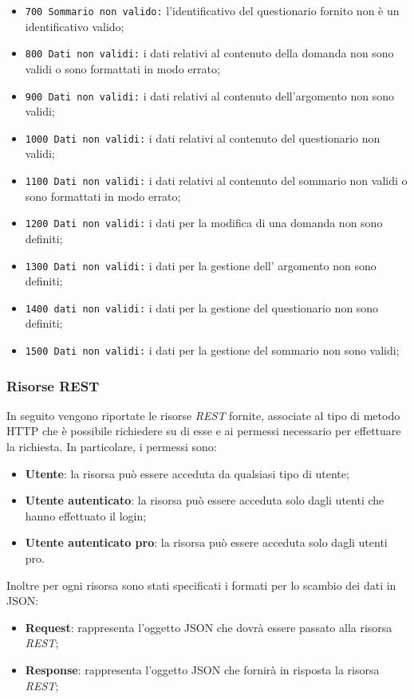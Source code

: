 \begin{itemize}
	\item \texttt{700 Sommario non valido:} l'identificativo del questionario fornito non è un identificativo valido;
	\item \texttt{800 Dati non validi:} i dati relativi al contenuto della domanda non sono  validi o sono formattati in modo errato;
	\item \texttt{900 Dati non validi:} i dati relativi al contenuto dell'argomento non sono validi;
	\item \texttt{1000 Dati non validi:} i dati relativi al contenuto del questionario non validi;
	\item \texttt{1100 Dati non validi:} i dati relativi al contenuto del  sommario non validi o sono formattati in modo errato;
	\item \texttt{1200 Dati non validi:} i dati per la modifica di una domanda non sono definiti;
	\item \texttt{1300 Dati non validi:} i dati per la gestione dell' argomento non sono definiti;
	\item \texttt{1400 dati non validi:} i dati per la gestione del questionario non sono definiti;
	\item \texttt{1500 Dati non validi:} i dati per la gestione del sommario non sono validi;
\end{itemize}

\subsubsection{Risorse REST}
In seguito vengono riportate le risorse \textit{REST} fornite, associate al tipo di metodo HTTP che è possibile richiedere su di esse e ai permessi necessario per effettuare la richiesta. In particolare, i permessi sono:
\begin{itemize}
	\item \textbf{Utente}: la risorsa può essere acceduta da qualsiasi tipo di utente;
	\item \textbf{Utente autenticato}: la risorsa può essere acceduta solo dagli utenti che hanno effettuato il login;
	\item \textbf{Utente autenticato pro}: la risorsa può essere acceduta solo dagli utenti pro.
\end{itemize}
Inoltre per ogni risorsa sono stati specificati i formati per lo scambio dei dati in JSON:
\begin{itemize}
	\item \textbf{Request}: rappresenta l'oggetto JSON che dovrà essere passato alla risorsa \textit{REST};
	\item \textbf{Response}: rappresenta l'oggetto JSON che fornirà in risposta la risorsa \textit{REST};
	
	
	
	
	
	
	
	
	
\end{itemize}